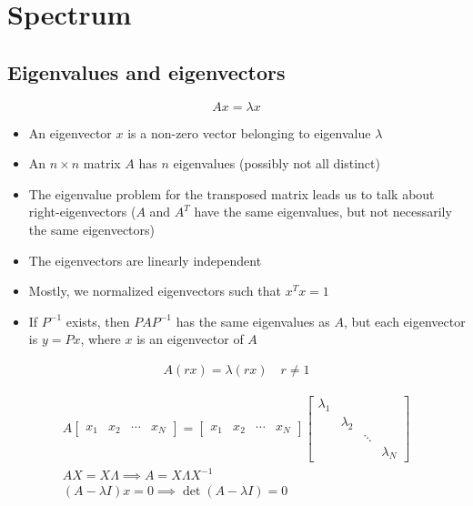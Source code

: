 
\section{Spectrum}

\subsection{Eigenvalues and eigenvectors}

$$
Ax = \lambda x
$$

\begin{itemize}
  \item An eigenvector $x$ is a non-zero vector belonging to eigenvalue $\lambda$
  \item An $n \times n$ matrix $A$ has $n$ eigenvalues (possibly not all distinct)
  \item The eigenvalue problem for the transposed matrix leads us to talk about 
  right-eigenvectors ($A$ and $A^T$ have the same eigenvalues, but not necessarily the same
  eigenvectors) 
  \item The eigenvectors are linearly independent
  \item Mostly, we normalized eigenvectors such that $x^Tx = 1$
  \item If $P^{-1}$ exists, then $PAP^{-1}$ has the same eigenvalues as $A$, but each 
  eigenvector is $y = Px$, where $x$ is an eigenvector of $A$
\end{itemize}

\begin{align*}
  A(rx) = \lambda (rx) \quad r \ne 1
\end{align*}

\begin{gather*}
  A 
  \begin{bmatrix}
    x_1 & x_2 & \cdots & x_N
  \end{bmatrix} =
  \begin{bmatrix}
    x_1 & x_2 & \cdots & x_N
  \end{bmatrix}
  \begin{bmatrix}
    \lambda_1 & & & \\
    & \lambda_2 & & \\
    & & \ddots & \\
    & & & \lambda_N
  \end{bmatrix} \\
  AX = X\Lambda \implies A = X\Lambda X^{-1} \\
  (A - \lambda I)x = 0 \implies \det(A - \lambda I) = 0
\end{gather*}

